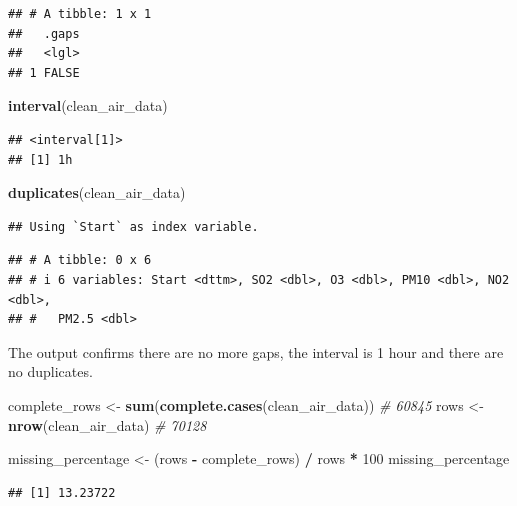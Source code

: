 \documentclass[
]{article}
\newenvironment{Shaded}{\begin{snugshade}}{\end{snugshade}}
\newcommand{\CommentTok}[1]{\textcolor[rgb]{0.56,0.35,0.01}{\textit{#1}}}
\newcommand{\DecValTok}[1]{\textcolor[rgb]{0.00,0.00,0.81}{#1}}
\newcommand{\FunctionTok}[1]{\textcolor[rgb]{0.13,0.29,0.53}{\textbf{#1}}}
\newcommand{\NormalTok}[1]{#1}
\newcommand{\OtherTok}[1]{\textcolor[rgb]{0.56,0.35,0.01}{#1}}
\newcommand{\SpecialCharTok}[1]{\textcolor[rgb]{0.81,0.36,0.00}{\textbf{#1}}}
\begin{document}
\begin{verbatim}
## # A tibble: 1 x 1
##   .gaps
##   <lgl>
## 1 FALSE
\end{verbatim}

\begin{Shaded}
\begin{Highlighting}[]
\FunctionTok{interval}\NormalTok{(clean\_air\_data)}
\end{Highlighting}
\end{Shaded}

\begin{verbatim}
## <interval[1]>
## [1] 1h
\end{verbatim}

\begin{Shaded}
\begin{Highlighting}[]
\FunctionTok{duplicates}\NormalTok{(clean\_air\_data)}
\end{Highlighting}
\end{Shaded}

\begin{verbatim}
## Using `Start` as index variable.
\end{verbatim}

\begin{verbatim}
## # A tibble: 0 x 6
## # i 6 variables: Start <dttm>, SO2 <dbl>, O3 <dbl>, PM10 <dbl>, NO2 <dbl>,
## #   PM2.5 <dbl>
\end{verbatim}

The output confirms there are no more gaps, the interval is 1 hour and
there are no duplicates.

\begin{Shaded}
\begin{Highlighting}[]
\NormalTok{complete\_rows }\OtherTok{\textless{}{-}} \FunctionTok{sum}\NormalTok{(}\FunctionTok{complete.cases}\NormalTok{(clean\_air\_data)) }\CommentTok{\# 60845}
\NormalTok{rows }\OtherTok{\textless{}{-}} \FunctionTok{nrow}\NormalTok{(clean\_air\_data) }\CommentTok{\# 70128}

\NormalTok{missing\_percentage }\OtherTok{\textless{}{-}}\NormalTok{ (rows }\SpecialCharTok{{-}}\NormalTok{ complete\_rows) }\SpecialCharTok{/}\NormalTok{ rows }\SpecialCharTok{*} \DecValTok{100}
\NormalTok{missing\_percentage}
\end{Highlighting}
\end{Shaded}

\begin{verbatim}
## [1] 13.23722
\end{verbatim}
\end{document}
